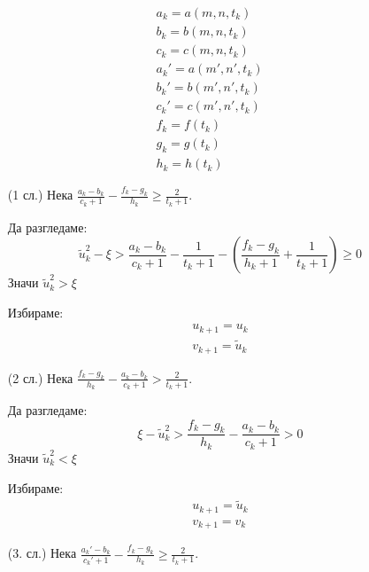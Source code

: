 \begin{solution}
\begin{itemize}
\begin{equation}
\begin{split}
                    a_k = a(m,n,t_k)\\
                    b_k = b(m,n,t_k)\\
                    c_k = c(m,n,t_k)\\
                    a_k' = a(m',n',t_k)\\
                    b_k' = b(m',n',t_k)\\
                    c_k' = c(m',n',t_k)\\
                    f_k = f(t_k) \\
                    g_k = g(t_k) \\
                    h_k = h(t_k)
                \end{split}
            \end{equation}
            \begin{itemize}
                \item[(1 сл.)] Нека $\frac{a_k - b_k}{c_k + 1} - \frac{f_k - g_k}{h_k} \geq \frac{2}{t_k+1}$.
                
                Да разгледаме:
                \begin{equation}
                    \tilde u_k^2 - \xi > \frac{a_k - b_k}{c_k+1} - \frac{1}{t_k+1} - \left(\frac{f_k-g_k}{h_k + 1} + \frac{1}{t_k +1}\right) \geq 0
                \end{equation}
                Значи $\tilde u_k^2 > \xi$
    
                Избираме:
                \begin{equation}
                    \begin{split}
                        u_{k+1} = u_k \\
                        v_{k+1} = \tilde u_k
                    \end{split}
                \end{equation}
    
                \item[(2 сл.)] Нека $\frac{f_k - g_k}{h_k} - \frac{a_k - b_k}{c_k + 1} > \frac{2}{t_k+1}$.
                
                Да разгледаме:
                \begin{equation}
                    \xi - \tilde u_k^2 > \frac{f_k - g_k}{h_k} - \frac{a_k - b_k}{c_k + 1} > 0
                \end{equation}
                Значи $\tilde u_k^2 < \xi$
    
                Избираме:
                \begin{equation}
                    \begin{split}
                        u_{k+1} = \tilde u_k \\
                        v_{k+1} = v_k
                    \end{split}
                \end{equation}
            \item[(3. сл.)] Нека $\frac{a_k' - b_k}{c_k' + 1} - \frac{f_k - g_k}{h_k} \geq \frac{2}{t_k+1}$.
                

\end{itemize}
\end{itemize}
\end{solution}
